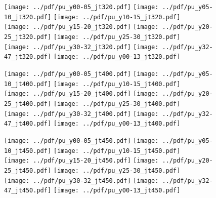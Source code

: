 \documentclass[landscape,10pt]{beamer} %
\begin{document}
\newpage

\begin{figure}[p]
\centering
\texttt{[image: ../pdf/pu\_y00-05\_jt320.pdf]}
\texttt{[image: ../pdf/pu\_y05-10\_jt320.pdf]}
\texttt{[image: ../pdf/pu\_y10-15\_jt320.pdf]}\\
\texttt{[image: ../pdf/pu\_y15-20\_jt320.pdf]}
\texttt{[image: ../pdf/pu\_y20-25\_jt320.pdf]}
\texttt{[image: ../pdf/pu\_y25-30\_jt320.pdf]}\\
\texttt{[image: ../pdf/pu\_y30-32\_jt320.pdf]}
\texttt{[image: ../pdf/pu\_y32-47\_jt320.pdf]}
\texttt{[image: ../pdf/pu\_y00-13\_jt320.pdf]}
\end{figure}

\newpage

\begin{figure}[p]
\centering
\texttt{[image: ../pdf/pu\_y00-05\_jt400.pdf]}
\texttt{[image: ../pdf/pu\_y05-10\_jt400.pdf]}
\texttt{[image: ../pdf/pu\_y10-15\_jt400.pdf]}\\
\texttt{[image: ../pdf/pu\_y15-20\_jt400.pdf]}
\texttt{[image: ../pdf/pu\_y20-25\_jt400.pdf]}
\texttt{[image: ../pdf/pu\_y25-30\_jt400.pdf]}\\
\texttt{[image: ../pdf/pu\_y30-32\_jt400.pdf]}
\texttt{[image: ../pdf/pu\_y32-47\_jt400.pdf]}
\texttt{[image: ../pdf/pu\_y00-13\_jt400.pdf]}
\end{figure}

\newpage

\begin{figure}[p]
\centering
\texttt{[image: ../pdf/pu\_y00-05\_jt450.pdf]}
\texttt{[image: ../pdf/pu\_y05-10\_jt450.pdf]}
\texttt{[image: ../pdf/pu\_y10-15\_jt450.pdf]}\\
\texttt{[image: ../pdf/pu\_y15-20\_jt450.pdf]}
\texttt{[image: ../pdf/pu\_y20-25\_jt450.pdf]}
\texttt{[image: ../pdf/pu\_y25-30\_jt450.pdf]}\\
\texttt{[image: ../pdf/pu\_y30-32\_jt450.pdf]}
\texttt{[image: ../pdf/pu\_y32-47\_jt450.pdf]}
\texttt{[image: ../pdf/pu\_y00-13\_jt450.pdf]}
\end{figure}
\end{document}
